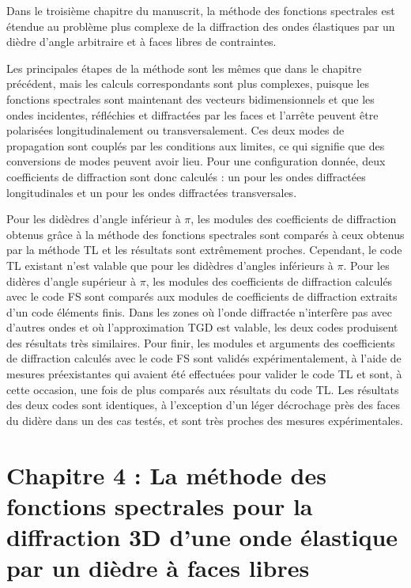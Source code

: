 Dans le troisième chapitre du manuscrit, la méthode des fonctions spectrales est étendue au problème plus complexe de la diffraction des ondes élastiques par un dièdre d'angle arbitraire et à faces libres de contraintes.

Les principales étapes de la méthode sont les mêmes que dans le chapitre précédent, mais les calculs correspondants sont plus complexes, puisque les fonctions spectrales sont maintenant des vecteurs bidimensionnels et que les ondes incidentes, réfléchies et diffractées par les faces et l'arrête peuvent être polarisées longitudinalement ou transversalement. Ces deux modes de propagation sont couplés par les conditions aux limites, ce qui signifie que des conversions de modes peuvent avoir lieu. Pour une configuration donnée, deux coefficients de diffraction sont donc calculés : un pour les ondes diffractées longitudinales et un pour les ondes diffractées transversales. 

Pour les didèdres d'angle inférieur à $\pi$, les modules des coefficients de diffraction obtenus grâce à la méthode des fonctions spectrales sont comparés à ceux obtenus par la méthode TL et les résultats sont extrêmement proches. Cependant, le code TL existant n'est valable que pour les didèdres d'angles inférieurs à $\pi$. Pour les didères d'angle supérieur à $\pi$, les modules des coefficients de diffraction calculés avec le code FS sont comparés aux modules de coefficients de diffraction extraits d'un code éléments finis. Dans les zones où l'onde diffractée n'interfère pas avec d'autres ondes et où l'approximation TGD est valable, les deux codes produisent des résultats très similaires. Pour finir, les modules et arguments des coefficients de diffraction calculés avec le code FS sont validés expérimentalement, à l'aide de mesures préexistantes qui avaient été effectuées pour valider le code TL et sont, à cette occasion, une fois de plus comparés aux résultats du code TL. Les résultats des deux codes sont identiques, à l'exception d'un léger décrochage près des faces du didère dans un des cas testés, et sont très proches des mesures expérimentales.

\section[Résumé du chapitre 4]{Chapitre 4 : La méthode des fonctions spectrales pour la diffraction 3D d'une onde élastique par un dièdre à faces libres}

